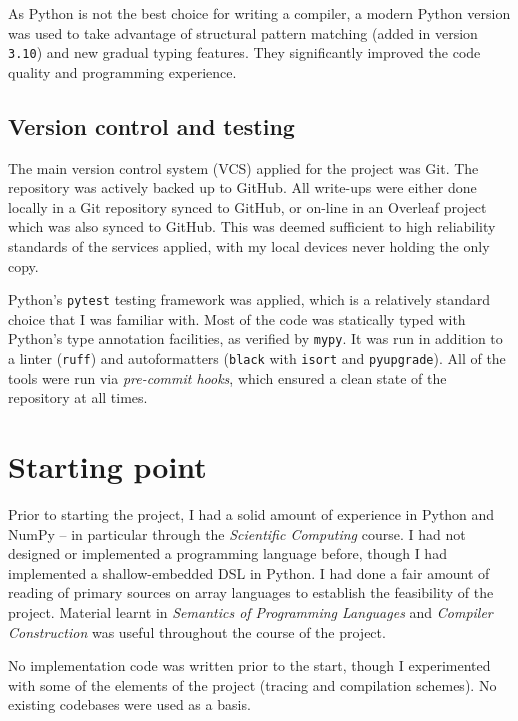 As Python is not the best choice for writing a compiler, a modern Python version was used to take advantage of structural pattern matching (added in version \texttt{3.10}) and new gradual typing features. They significantly improved the code quality and programming experience. 

\subsection{Version control and testing}

The main version control system (VCS) applied for the project was Git. The repository was actively backed up to GitHub. All write-ups were either done locally in a Git repository synced to GitHub, or on-line in an Overleaf project which was also synced to GitHub. This was deemed sufficient to high reliability standards of the services applied, with my local devices never holding the only copy. 

Python's \texttt{pytest} testing framework was applied, which is a relatively standard choice that I was familiar with.
Most of the code was statically typed with Python's type annotation facilities, as verified by \texttt{mypy}. It was run in addition to a linter (\texttt{ruff}) and autoformatters (\texttt{black} with \texttt{isort} and \texttt{pyupgrade}). All of the tools were run via \textit{pre-commit hooks}, which ensured a clean state of the repository at all times.



\section{Starting point}
\label{starting-point}

Prior to starting the project, I had a solid amount of experience in Python and NumPy -- in particular through the \textit{Scientific Computing} course. I had not designed or implemented a programming language before, though I had implemented a shallow-embedded DSL in Python. I had done a fair amount of reading of primary sources on array languages to establish the feasibility of the project. Material learnt in \textit{Semantics of Programming Languages} and \textit{Compiler Construction} was useful throughout the course of the project.

No implementation code was written prior to the start, though I experimented with some of the elements of the project (tracing and compilation schemes). No existing codebases were used as a basis. 
